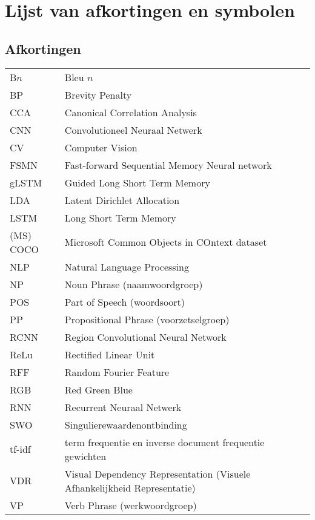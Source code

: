 \documentclass[master=cws,masteroption=ai]{kulemt}
\begin{document}
\begin{preface}
\end{preface}

\tableofcontents*

\begin{abstract}
\end{abstract}

\listoffiguresandtables
\chapter{Lijst van afkortingen en symbolen}
\section*{Afkortingen}
\begin{flushleft}
  \renewcommand{\arraystretch}{1.1}
  \begin{tabularx}{\textwidth}{@{}p{25mm}X@{}}
  	B$n$ & Bleu $n$\\
  	BP & Brevity Penalty\\
  	CCA & Canonical Correlation Analysis \\
  	CNN & Convolutioneel Neuraal Netwerk \\
  	CV & Computer Vision \\
  	FSMN & Fast-forward Sequential Memory Neural network\\
  	gLSTM & Guided Long Short Term Memory \\
    LDA  & Latent Dirichlet Allocation \\
    LSTM & Long Short Term Memory \\
    (MS) COCO & Microsoft Common Objects in COntext dataset\\
    NLP & Natural Language Processing\\
    NP & Noun Phrase (naamwoordgroep)\\
    POS & Part of Speech (woordsoort)\\
    PP & Propositional Phrase (voorzetselgroep)\\
    RCNN & Region Convolutional Neural Network \\
    ReLu & Rectified Linear Unit\\
    RFF & Random Fourier Feature \\
    RGB & Red Green Blue\\
    RNN & Recurrent Neuraal Netwerk \\
    SWO & Singulierewaardenontbinding \\
    tf-idf & term frequentie en inverse document frequentie gewichten \\
	VDR & Visual Dependency Representation (Visuele Afhankelijkheid Representatie)\\
	VP & Verb Phrase (werkwoordgroep)\\

  \end{tabularx}
\end{flushleft}
\end{document}
